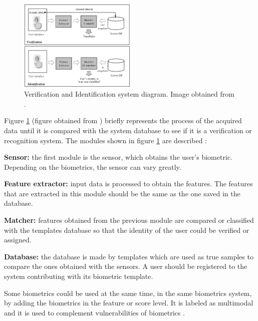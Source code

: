 \begin{figure}[htb]
\centering
\includegraphics[width=0.5\textwidth]{images_miscelaneus/verif_identif.PNG}
\caption{Verification and Identification system diagram. Image obtained from \cite{Intro_biometrics2}.} \label{fig:Verif_ident}
\end{figure}

Figure \ref{fig:Verif_ident} (figure obtained from \cite{Intro_biometrics2}) briefly represents  the process of the acquired data until it is compared  with the system database to see if it is a verification or recognition system. The modules shown in figure \ref{fig:Verif_ident} are described \cite{Intro_biometrics2}:
\begin{description}[itemsep=2pt,topsep=8pt,parsep=0pt,partopsep=20pt]
\item \textbf{Sensor:} the first module is the sensor, which obtains the user's biometric. Depending on the biometrics, the sensor can vary greatly.
\item \textbf{Feature extractor:} input data is processed to obtain the features. The features that are extracted in this module should be the same as the one saved in the database.
\item \textbf{Matcher:} features obtained from the previous module are compared or classified with the templates database so that the identity of the user could be verified or assigned.
\item \textbf{Database:} the database is made by templates which are used as true samples to compare the ones obtained with the sensors. A user should be registered to the system contributing with its biometric template.
\end{description}

Some biometrics could be used at the same time, in the same biometrics system, by adding the biometrics in the feature or score level. It is labeled as multimodal and it is used to complement vulnerabilities of biometrics \cite{Spoofing_survey}.

